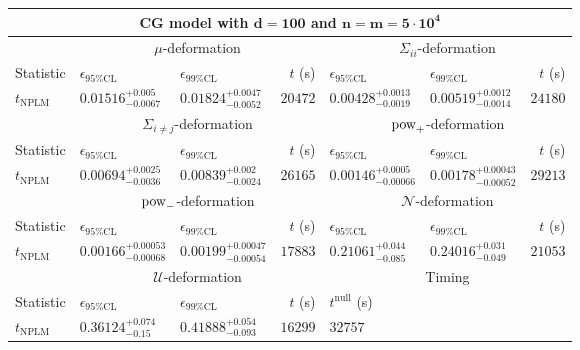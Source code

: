 \begin{tabular}{l|llr|llr}
	\toprule
	\multicolumn{7}{c}{{\bf CG model with $\mathbf{d=100}$ and $\mathbf{n=m=5\cdot 10^{4}}$}} \\
	\toprule
	\multicolumn{1}{c}{} & \multicolumn{3}{c}{$\mu$-deformation} & \multicolumn{3}{c}{$\Sigma_{ii}$-deformation} \\
	Statistic & $\epsilon_{95\%\mathrm{CL}}$ & $\epsilon_{99\%\mathrm{CL}}$ & $t$ (s) & $\epsilon_{95\%\mathrm{CL}}$ & $\epsilon_{99\%\mathrm{CL}}$ & $t$ (s) \\
	\midrule
	$t_{\mathrm{NPLM}}$ & $0.01516_{-0.0067}^{+0.005}$ & $0.01824_{-0.0052}^{+0.0047}$ & $20472$ & $0.00428_{-0.0019}^{+0.0013}$ & $0.00519_{-0.0014}^{+0.0012}$ & $24180$ \\
	\toprule
	\multicolumn{1}{c}{} & \multicolumn{3}{c}{$\Sigma_{i\neq j}$-deformation} & \multicolumn{3}{c}{$\rm{pow}_{+}$-deformation} \\
	Statistic & $\epsilon_{95\%\mathrm{CL}}$ & $\epsilon_{99\%\mathrm{CL}}$ & $t$ (s) & $\epsilon_{95\%\mathrm{CL}}$ & $\epsilon_{99\%\mathrm{CL}}$ & $t$ (s) \\
	\midrule
	$t_{\mathrm{NPLM}}$ & $0.00694_{-0.0036}^{+0.0025}$ & $0.00839_{-0.0024}^{+0.002}$ & $26165$ & $0.00146_{-0.00066}^{+0.0005}$ & $0.00178_{-0.00052}^{+0.00043}$ & $29213$ \\
	\toprule
	\multicolumn{1}{c}{} & \multicolumn{3}{c}{$\rm{pow}_{-}$-deformation} & \multicolumn{3}{c}{$\mathcal{N}$-deformation} \\
	Statistic & $\epsilon_{95\%\mathrm{CL}}$ & $\epsilon_{99\%\mathrm{CL}}$ & $t$ (s) & $\epsilon_{95\%\mathrm{CL}}$ & $\epsilon_{99\%\mathrm{CL}}$ & $t$ (s) \\
	\midrule
	$t_{\mathrm{NPLM}}$ & $0.00166_{-0.00068}^{+0.00053}$ & $0.00199_{-0.00054}^{+0.00047}$ & $17883$ & $0.21061_{-0.085}^{+0.044}$ & $0.24016_{-0.049}^{+0.031}$ & $21053$ \\
	\toprule
	\multicolumn{1}{c}{} & \multicolumn{3}{c}{$\mathcal{U}$-deformation} & \multicolumn{3}{c}{Timing} \\
	Statistic & $\epsilon_{95\%\mathrm{CL}}$ & $\epsilon_{99\%\mathrm{CL}}$ & $t$ (s) & $t^{\mathrm{null}}$ (s) \\
	\midrule
	$t_{\mathrm{NPLM}}$ & $0.36124_{-0.15}^{+0.074}$ & $0.41888_{-0.093}^{+0.054}$ & $16299$ & $32757$ \\
	\bottomrule
\end{tabular}